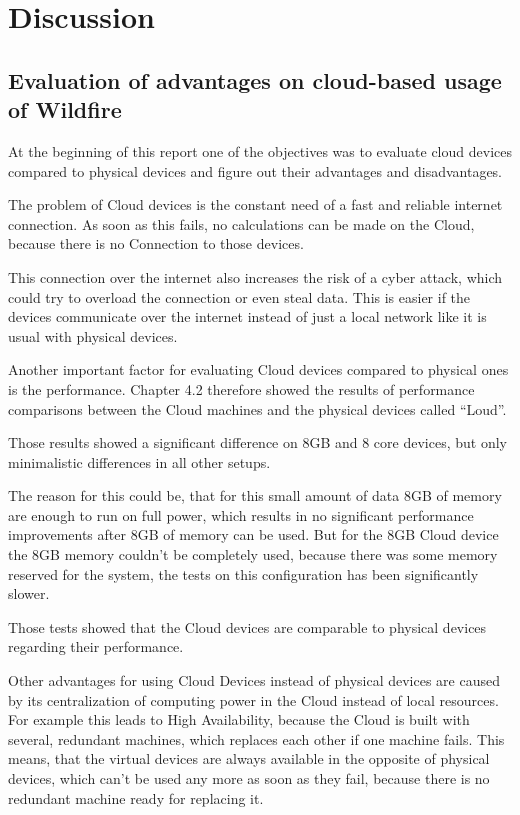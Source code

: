 
\chapter{Discussion}

\section{Evaluation of advantages on cloud-based usage of Wildfire}

At the beginning of this report one of the objectives was to evaluate cloud devices compared to physical devices and figure out their advantages and disadvantages.

The problem of Cloud devices is the constant need of a fast and reliable internet connection. As soon as this fails, no calculations can be made on the Cloud, because there is no Connection to those devices.

This connection over the internet also increases the risk of a cyber attack, which could try to overload the connection or even steal data. This is easier if the devices communicate over the internet instead of just a local network like it is usual with physical devices.

Another important factor for evaluating Cloud devices compared to physical ones is the performance. Chapter 4.2 therefore showed the results of performance comparisons between the Cloud machines and the physical devices called ``Loud''.

Those results showed a significant difference on 8GB and 8 core devices, but only minimalistic differences in all other setups.

The reason for this could be, that for this small amount of data 8GB of memory are enough to run on full power, which results in no significant performance improvements after 8GB of memory can be used. But for the 8GB Cloud device the 8GB memory couldn't be completely used, because there was some memory reserved for the system, the tests on this configuration has been significantly slower.

Those tests showed that the Cloud devices are comparable to physical devices regarding their performance.

Other advantages for using Cloud Devices instead of physical devices are caused by its centralization of computing power in the Cloud instead of local resources. For example this leads to High Availability, because the Cloud is built with several, redundant machines, which replaces each other if one machine fails. This means, that the virtual devices are always available in the opposite of physical devices, which can't be used any more as soon as they fail, because there is no redundant machine ready for replacing it.

